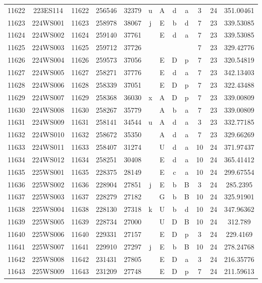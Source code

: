 \begin{tabular}{|*{12}{c|}}
11622 & 223ES114 & 11622 & 256546 & 32379 & u & A & d & a & 3 & 24 & 351.00461 \\ 
11623 & 224WS001 & 11623 & 258978 & 38067 & j & E & b & d & 7 & 23 & 339.53085 \\ 
11624 & 224WS002 & 11624 & 259140 & 37761 &  & E & d & a & 7 & 23 & 339.53085 \\ 
11625 & 224WS003 & 11625 & 259712 & 37726 &  &  &  &  & 7 & 23 & 329.42776 \\ 
11626 & 224WS004 & 11626 & 259573 & 37056 &  & E & D & p & 7 & 23 & 320.54819 \\ 
11627 & 224WS005 & 11627 & 258271 & 37776 &  & E & d & a & 7 & 23 & 342.13403 \\ 
11628 & 224WS006 & 11628 & 258339 & 37051 &  & E & D & p & 7 & 23 & 322.43488 \\ 
11629 & 224WS007 & 11629 & 258368 & 36030 & x & A & D & p & 7 & 23 & 339.00809 \\ 
11630 & 224WS008 & 11630 & 258267 & 35779 &  & A & b & a & 7 & 23 & 339.00809 \\ 
11631 & 224WS009 & 11631 & 258141 & 34544 & u & A & d & a & 3 & 23 & 332.77185 \\ 
11632 & 224WS010 & 11632 & 258672 & 35350 &  & A & d & a & 7 & 23 & 329.66269 \\ 
11633 & 224WS011 & 11633 & 258407 & 31274 &  & U & d & a & 10 & 24 & 371.97437 \\ 
11634 & 224WS012 & 11634 & 258251 & 30408 &  & E & d & a & 10 & 24 & 365.41412 \\ 
11635 & 225WS001 & 11635 & 228375 & 28149 &  & E & c & a & 10 & 24 & 299.67554 \\ 
11636 & 225WS002 & 11636 & 228904 & 27851 & j & E & b & B & 3 & 24 & 285.2395 \\ 
11637 & 225WS003 & 11637 & 228279 & 27182 &  & G & b & B & 10 & 24 & 325.91901 \\ 
11638 & 225WS004 & 11638 & 228130 & 27318 & k & U & b & d & 10 & 24 & 347.96362 \\ 
11639 & 225WS005 & 11639 & 228734 & 27000 &  & U & D & B & 10 & 24 & 312.789 \\ 
11640 & 225WS006 & 11640 & 229331 & 27157 &  & E & D & p & 3 & 24 & 229.4169 \\ 
11641 & 225WS007 & 11641 & 229910 & 27297 & j & E & b & B & 10 & 24 & 278.24768 \\ 
11642 & 225WS008 & 11642 & 231431 & 27805 &  & E & D & a & 3 & 24 & 216.35776 \\ 
11643 & 225WS009 & 11643 & 231209 & 27748 &  & E & D & p & 7 & 24 & 211.59613 \\ 

\end{tabular}
